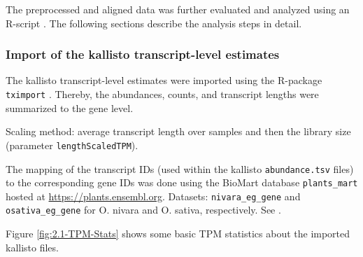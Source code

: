 The preprocessed and aligned data was further evaluated and analyzed using an R-script \autocite{R-base}. The following sections describe the analysis steps in detail.

\subsubsection{Import of the kallisto transcript-level estimates}

The kallisto transcript-level estimates were imported using the R-package \verb|tximport| \autocite{R-tximport, tximport2015}. Thereby, the  abundances, counts, and transcript lengths were summarized to the gene level.

Scaling method: average transcript length over samples and then the library size (parameter \verb|lengthScaledTPM|).

The mapping of the transcript IDs (used within the kallisto \verb|abundance.tsv| files) to the corresponding gene IDs was done using the BioMart database \verb|plants_mart| hosted at \url{https://plants.ensembl.org}. Datasets: \verb|nivara_eg_gene| and \verb|osativa_eg_gene| for O. nivara and O. sativa, respectively. See \autocite{R-biomaRt, biomaRt2009}.

Figure \ref{fig:2.1-TPM-Stats} shows some basic TPM statistics about the imported kallisto files.

